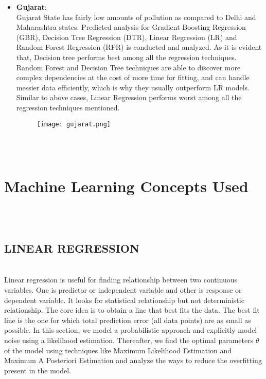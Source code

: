 \documentclass{article}
\begin{document}
\begin{itemize}
\item \textbf{Gujarat}: \\
     Gujarat State has fairly low amounts of pollution as compared to Delhi and Maharashtra states. Predicted analysis for Gradient Boosting Regression (GBR), Decision Tree Regression (DTR), Linear Regression (LR) and Random Forest Regression (RFR) is conducted and analyzed. As it is evident that, Decision tree performs best among all the regression techniques. Random Forest and Decision Tree techniques are able to discover more complex dependencies at the cost of more time for fitting, and can handle messier data efficiently, which is why they usually outperform LR models. Similar to above cases, Linear Regression performs worst among all the regression techniques mentioned. \\
     \begin{figure}[H]
     \centering
    \texttt{[image: gujarat.png]}
    \label{fig:Caption}
    \end{figure}
\\ \\
\end{itemize}
\newpage
\section {Machine Learning Concepts Used}
\\ \\

\subsection {\color{blue}
\textbf{LINEAR REGRESSION}} \\ 
 Linear regression is useful for finding relationship between two continuous variables. One is predictor or independent variable and other is response or dependent variable. It looks for statistical relationship but not deterministic relationship. The core idea is to obtain a line that best fits the data. The best fit line is the one for which total prediction error (all data points) are as small as possible. In this section, we model a probabilistic approach and explicitly model noise using a likelihood estimation. Thereafter, we find the optimal parameters $\theta$ of the model  using techniques like Maximum Likelihood Estimation and Maximum A Posteriori Estimation and analyze the ways to reduce the overfitting present in the model. \\ 
\end{document}

